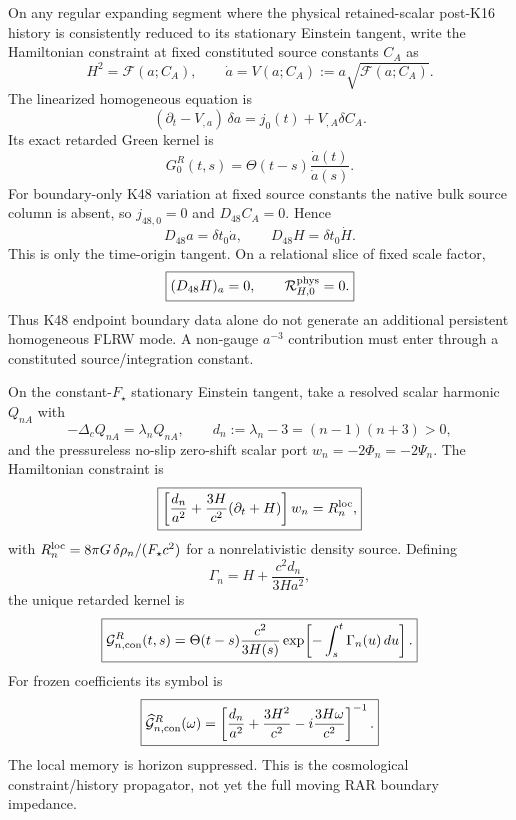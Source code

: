 \documentclass[12pt,a4paper]{article}
\begin{document}
\begin{theorem}
\label{p8:thm:v2145-k48-n0-propagator}
On any regular expanding segment where the physical retained-scalar post-K16
history is consistently reduced to its stationary Einstein tangent, write the
Hamiltonian constraint at fixed constituted source
constants $C_A$ as
\[
 H^2=\mathcal F(a;C_A),\qquad
 \dot a=V(a;C_A):=a\sqrt{\mathcal F(a;C_A)}.
\]
The linearized homogeneous equation is
\[
 (\partial_t-V_{,a})\,\delta a=j_0(t)+V_{,A}\delta C_A.
\]
Its exact retarded Green kernel is
\[
 \boxed{
 G_0^R(t,s)=\Theta(t-s)\frac{\dot a(t)}{\dot a(s)}.}
\]
For boundary-only K48 variation at fixed source constants the native bulk source
column is absent, so $j_{48,0}=0$ and $D_{48}C_A=0$.  Hence
\[
 D_{48}a=\delta t_0\dot a,\qquad D_{48}H=\delta t_0\dot H.
\]
This is only the time-origin tangent.  On a relational slice of fixed scale
factor,
\[
 \boxed{(D_{48}H)_a=0,\qquad
 \mathcal R_{H,0}^{\rm phys}=0.}
\]
Thus K48 endpoint boundary data alone do not generate an additional persistent
homogeneous FLRW mode.  A non-gauge $a^{-3}$ contribution must enter through a
constituted source/integration constant.
\end{theorem}

\begin{theorem}
\label{p8:thm:v2145-closed-s3-cold-propagator}
On the constant-$F_\star$ stationary Einstein tangent, take a resolved scalar
harmonic $Q_{nA}$ with
\[
 -\Delta_cQ_{nA}=\lambda_nQ_{nA},\qquad
 d_n:=\lambda_n-3=(n-1)(n+3)>0,
\]
and the pressureless no-slip zero-shift scalar port $w_n=-2\Phi_n=-2\Psi_n$.
The Hamiltonian constraint is
\[
 \boxed{
 \left[\frac{d_n}{a^2}+\frac{3H}{c^2}(\partial_t+H)\right]w_n
 =R_n^{\rm loc},}
\]
with $R_n^{\rm loc}=8\pi G\,\delta\rho_n/(F_\star c^2)$ for a
nonrelativistic density source.  Defining
\[
 \Gamma_n=H+\frac{c^2d_n}{3Ha^2},
\]
the unique retarded kernel is
\[
 \boxed{
 \mathcal G_{n,\rm con}^{R}(t,s)
 =\Theta(t-s)\frac{c^2}{3H(s)}
 \exp\!\left[-\int_s^t\Gamma_n(u)\,du\right].}
\]
For frozen coefficients its symbol is
\[
 \boxed{
 \widehat{\mathcal G}_{n,\rm con}^{R}(\omega)
 =\left[\frac{d_n}{a^2}+\frac{3H^2}{c^2}
 -i\frac{3H\omega}{c^2}\right]^{-1}.}
\]
The local memory is horizon suppressed.  This is the cosmological
constraint/history propagator, not yet the full moving RAR boundary impedance.
\end{theorem}
\end{document}
